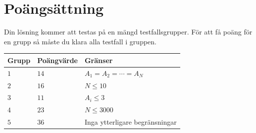 \section*{Poängsättning}
Din lösning kommer att testas på en mängd testfallsgrupper.
För att få poäng för en grupp så måste du klara alla testfall i gruppen.

\noindent
\begin{tabular}{| l | l | p{12cm} |}
  \hline
  Grupp & Poängvärde & Gränser \\ \hline
  $1$   & $14$       & $A_1 = A_2 = \cdots = A_N$\\ \hline
  $2$   & $16$       & $N \leq 10$  \\ \hline
  $3$   & $11$       & $A_i \leq 3$ \\ \hline
  $4$   & $23$       & $N \leq 3000$ \\ \hline
  $5$   & $36$       & Inga ytterligare begränsningar \\ \hline
\end{tabular}
